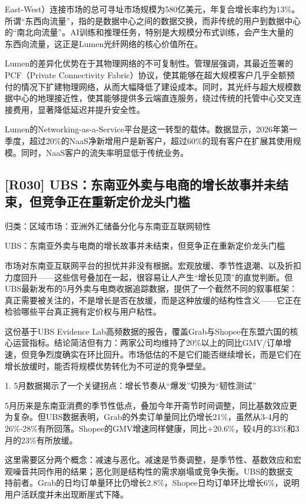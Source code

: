 \documentclass[11pt]{ctexart}
\begin{document}
East-West）连接市场的总可寻址市场规模为580亿美元，年复合增长率约为13\%。所谓“东西向流量”，指的是数据中心之间的数据交换，而非传统的用户到数据中心的“南北向流量”。AI训练和推理任务，特别是大规模分布式训练，会产生大量的东西向流量，这正是Lumen光纤网络的核心价值所在。

Lumen的差异化优势在于其物理网络的不可复制性。管理层强调，其最近签署的PCF（Private Connectivity Fabric）协议，使其能够在超大规模客户几乎全额预付的情况下扩建物理网络，从而大幅降低了建设成本。同时，其光纤与超大规模数据中心的地理接近性，使其能够提供多云端直连服务，绕过传统的托管中心交叉连接费用，显著降低延迟并提升安全性。

Lumen的Networking-as-a-Service平台是这一转型的载体。数据显示，2026年第一季度，超过20\%的NaaS净新增用户是新客户，超过60\%的现有客户在扩展其使用规模。同时，NaaS客户的流失率明显低于传统业务。

\subsection{[R030] UBS：东南亚外卖与电商的增长故事并未结束，但竞争正在重新定价龙头门槛}
{\small\color{refgray}归类：区域市场：亚洲外汇储备分化与东南亚互联网韧性}

UBS：东南亚外卖与电商的增长故事并未结束，但竞争正在重新定价龙头门槛

市场对东南亚互联网平台的担忧并非没有根据。宏观放缓、季节性退潮、以及折扣力度回升——这些信号叠加在一起，很容易让人产生“增长见顶”的直觉判断。但UBS最新发布的5月外卖与电商收据追踪数据，提供了一个截然不同的叙事框架：真正需要被关注的，不是增长是否在放缓，而是这种放缓的结构性含义——它正在检验哪些平台真正拥有定价权与用户粘性。

这份基于UBS Evidence Lab高频数据的报告，覆盖Grab与Shopee在东盟六国的核心运营指标。结论简洁但有力：两家公司均维持了20\%以上的同比GMV/订单增速，但竞争烈度确实在环比回升。市场低估的不是它们能否继续增长，而是它们在增长放缓时，能否将规模优势转化为不可逆的竞争壁垒。

1. 5月数据揭示了一个关键拐点：增长节奏从“爆发”切换为“韧性测试”

5月历来是东南亚消费的季节性低点，叠加今年开斋节时间调整，同比基数效应更为复杂。但UBS数据表明，Grab的外卖订单量同比仍增长21\%，虽然从3-4月的26\%-28\%有所回落。Shopee的GMV增速同样健康，同比+20.6\%，较4月的33\%和3月的23\%有所放缓。

这里需要区分两个概念：减速与恶化。减速是节奏调整，是季节性、基数效应和宏观噪音共同作用的结果；恶化则是结构性的需求崩塌或竞争失衡。UBS的数据支持前者。Grab的日均订单量环比仍增长2.8\%，Shopee日均订单环比增长6\%，说明用户活跃度并未出现断崖式下降。
\end{document}

